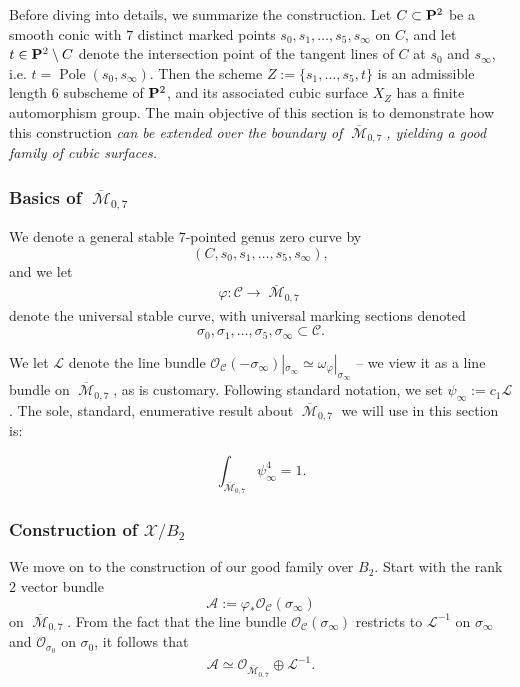 \documentclass[12pt,reqno]{amsart}
\DeclareMathOperator{\Pole}{Pole}
\DeclareMathOperator{\M}{\mathcal{M}}
\renewcommand{\to}{{\longrightarrow}}
\numberwithin{equation}{section}
\renewcommand{\O}{\mathcal O}
\begin{document}
Before diving into details, we summarize the construction. Let
$C \subset \P^{2}$ be a smooth conic with $7$ distinct marked points
$s_{0}, s_{1}, \dots, s_{5}, s_{\infty}$ on $C$, and let
$t \in \P^{2} \setminus C$ denote the intersection point of the
tangent lines of $C$ at $s_{0}$ and $s_{\infty}$, i.e.
$t = \Pole(s_{0},s_{\infty})$.  Then the scheme
$Z := \{s_{1}, \dots , s_{5}, t \}$ is an admissible length $6$
subscheme of $\P^{2}$, and its associated cubic surface $X_{Z}$ has a
finite automorphism group.  The main objective of this section is to
demonstrate how this construction {\sl can be extended over the
  boundary of $\overline{\M}_{0,7}$, yielding a good family of cubic
  surfaces.}

\subsubsection{Basics of $\overline{\M}_{0,7}$}
\label{sec:basics-overlinem_0-7}

We denote a general stable $7$-pointed genus zero curve by
$$(C, s_{0}, s_{1}, \dots, s_{5}, s_{\infty}),$$
and we let 
\begin{align}
  \label{eq:PM07}
  \varphi: \mathcal{C} \to \overline{\M}_{0,7}
\end{align}
denote the universal stable curve, with universal marking sections
denoted $$\sigma_{0}, \sigma_{1}, \dots, \sigma_{5}, \sigma_{\infty} \subset \mathcal{C}.$$

We let $\mathcal{L}$ denote the line bundle
$\O_{\mathcal{C}}(-\sigma_{\infty})|_{\sigma_{\infty}} \simeq
\omega_{\varphi}|_{\sigma_{\infty}}$ -- we view it as a line bundle on
$\overline{\M}_{0,7}$, as is customary.  Following standard notation,
we set $\psi_{\infty} := c_{1}\mathcal{L}$.  The sole, standard,
enumerative result about $\overline{\M}_{0,7}$ we will use in this
section is:
\begin{theorem}
  \label{theorem:psi}
  $$\int_{\overline{\M}_{0,7}} \psi_{\infty}^{4} = 1.$$
\end{theorem}

\subsubsection{Construction of $\mathcal{X}/B_{2}$}
\label{sec:construction-familyB2}


We move on to the construction of our good family over $B_2$. Start
with the rank $2$ vector bundle
$$\mathcal{A} := \varphi_{*}\O_{\mathcal{C}}(\sigma_{\infty})$$ on
$\overline{\M}_{0,7}$.  From the fact that the line bundle
$\O_{\mathcal{C}}(\sigma_{\infty})$ restricts to $\mathcal{L}^{-1}$ on
$\sigma_{\infty}$ and $\O_{\sigma_{0}}$ on $\sigma_{0}$, it follows
that
\begin{align*}
  \mathcal{A} \simeq \O_{\overline{\M}_{0,7}} \oplus \mathcal{L}^{-1}.
\end{align*}
\end{document}
